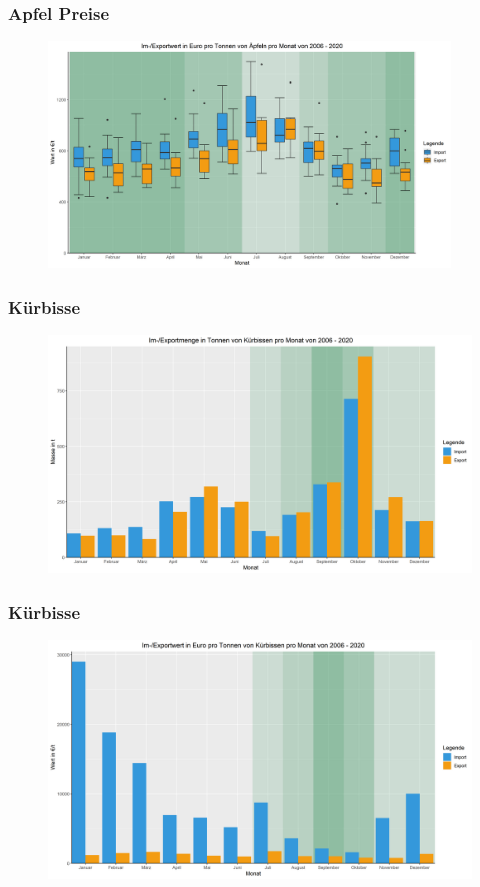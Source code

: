 \documentclass{beamer}
\begin{document}
\begin{frame}
\frametitle{Apfel Preise}
  \begin{figure}[h]
    \centering
    \includegraphics[height=6cm]{4_apfel_preis}
  \end{figure}
\end{frame}

\begin{frame}
	\frametitle{Kürbisse}
	\begin{figure}[b]
		\centering
		\includegraphics[scale=0.35]{Kuerbissen_monthly_weight_Im-Export}
	\end{figure}
\end{frame}

\begin{frame}
	\frametitle{Kürbisse}
	\begin{figure}[b]
		\centering
		\includegraphics[scale=0.35]{Kuerbissen_monthly_Euro_per_weight_Im-Export}
	\end{figure}
\end{frame}
\end{document}
